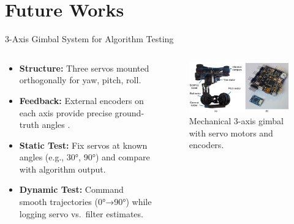 \documentclass[aspectratio=169,xcolor=dvipsnames]{beamer}
\begin{document}
\section{Future Works}

\begin{frame}{3-Axis Gimbal System for Algorithm Testing}
\begin{columns}[T]
  \begin{column}{0.5\textwidth}
    \begin{itemize}
      \item \textbf{Structure:} Three servos mounted orthogonally for yaw, pitch, roll.
      \item \textbf{Feedback:} External encoders on each axis provide precise ground-truth angles \cite{gimbal3}.
      \item \textbf{Static Test:} Fix servos at known angles (e.g., 30°, 90°) and compare with algorithm output.
      \item \textbf{Dynamic Test:} Command smooth trajectories (0°→90°) while logging servo vs.\ filter estimates.
    \end{itemize}
  \end{column}
  
  \begin{column}{0.48\textwidth}
    \begin{figure}
      \centering
      \includegraphics[width=\linewidth]{logos/gimball.jpg}
      \caption{Mechanical 3-axis gimbal with servo motors and encoders.}
      \label{fig:gimbal_system}
    \end{figure}
  \end{column}
\end{columns}
\end{frame}
\end{document}

